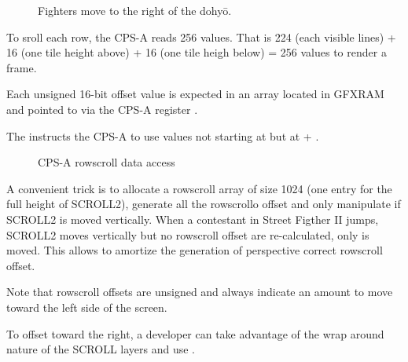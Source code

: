 \begin{figure}[H]
\caption*{Fighters move to the right of the dohyō.}
 \end{figure}%

To sroll each row, the CPS-A reads 256 values. That is 224 (each visible lines) + 16 (one tile height above) + 16 (one tile heigh below) = 256 values to render a frame.

Each unsigned 16-bit offset value is expected in an array located in GFXRAM and pointed to via the CPS-A register .

The  instructs the CPS-A to use values not starting at  but at  + . 

\begin{figure}[H]
 \caption*{CPS-A rowscroll data access}%
 \end{figure}%

A convenient trick is to allocate a rowscroll array of size 1024 (one entry for the full height of SCROLL2), generate all the rowscrollo offset and only manipulate  if SCROLL2 is moved vertically. When a contestant in Street Figther II jumps, SCROLL2 moves vertically but no rowscroll offset are re-calculated, only   is moved. This allows to amortize the generation of perspective correct rowscroll offset.

 


Note that rowscroll offsets are unsigned and always indicate an amount to move toward the left side of the screen. 

To offset toward the right, a developer can take advantage of the wrap around nature of the SCROLL layers and use .



















